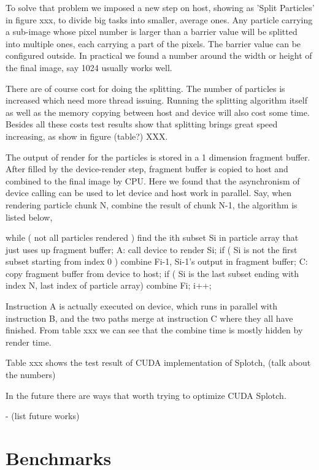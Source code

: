 To solve that problem we imposed a new step on host, showing as 'Split Particles' in figure xxx, to divide big tasks into smaller, average ones. Any particle carrying a sub-image whose pixel number is larger than a barrier value will be splitted into multiple ones, each carrying a part of the pixels. The barrier value can be configured outside. In practical we found a number around the width or height of the final image, say 1024 usually works well.

There are of course cost for doing the splitting. The number of particles is increased which need more thread issuing. Running the splitting algorithm itself as well as the memory copying between host and device will also cost some time. Besides all these costs test results show that splitting brings great speed increasing, as show in figure (table?) XXX.

The output of render for the particles is stored in a 1 dimension fragment buffer. After filled by the device-render step, fragment buffer is copied to host and combined to the final image by CPU. Here we found that the asynchronism of device calling can be used to let device and host work in parallel. Say, when rendering particle chunk N, combine the result of chunk N-1, the algorithm is listed below,

while  ( not all particles rendered )
{
         find the ith subset Si in particle array that just uses up fragment buffer;
A:	call device to render Si;
 	if  ( Si is not the first subset starting from index 0 )
 	{ 
         	combine Fi-1, Si-1's output in fragment buffer;
 	}
C:	copy fragment buffer from device to host;
 	if  ( Si is the last subset ending with index N, last index of particle array)
 	{
 		combine Fi;
 	}
 	i++;
}

Instruction A is actually executed on device, which runs in parallel with instruction B, and the two paths merge at instruction C where they all have finished. From table xxx we can see that the combine time is mostly hidden by render time. 

Table xxx shows the test result of CUDA implementation of Splotch, (talk about the numbers)

In the future there are ways that worth trying to optimize CUDA Splotch. 

- (list future works)


\section{Benchmarks}
\label{bench}

